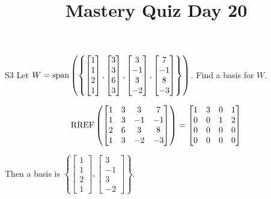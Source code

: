 \documentclass{sbgLAquiz}
\title{Mastery Quiz Day 20 }
\begin{document}
\begin{problem}{S3}
Let $W = {\rm span} \left( \left\{ \begin{bmatrix} 1 \\ 1 \\ 2 \\ 1 \end{bmatrix}, \begin{bmatrix} 3 \\ 3 \\ 6 \\ 3 \end{bmatrix}, \begin{bmatrix} 3 \\ -1 \\ 3 \\ -2 \end{bmatrix}, \begin{bmatrix} 7 \\ -1 \\ 8 \\ -3 \end{bmatrix} \right\} \right)$.  Find a basis for $W$.
\end{problem}
\begin{solution}
$$\operatorname{RREF}\left(\begin{bmatrix} 1 & 3 & 3 & 7 \\ 1 & 3 & -1 & -1 \\ 2 & 6 & 3 & 8 \\ 1 & 3 & -2 & -3 \end{bmatrix}\right) = \begin{bmatrix} 1 & 3 & 0 & 1 \\ 0 & 0 & 1 & 2 \\ 0 & 0 & 0 & 0 \\  0 & 0 & 0 & 0 \end{bmatrix}$$

Then a basis is 
$ \left\{ \begin{bmatrix} 1 \\ 1 \\ 2 \\ 1 \end{bmatrix} , \begin{bmatrix} 3 \\ -1 \\ 3 \\ -2 \end{bmatrix}\right\} $.
\end{solution}
\end{document}
